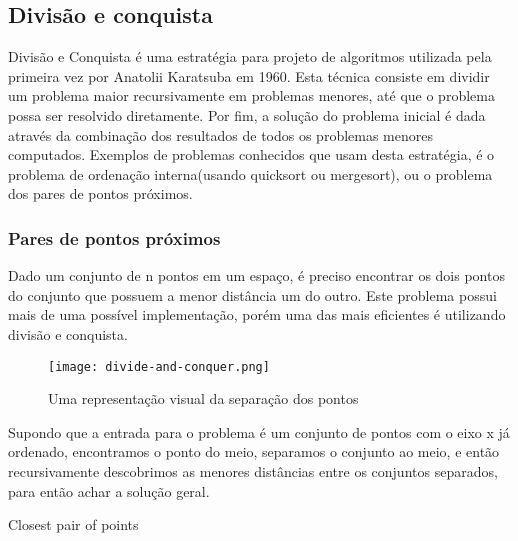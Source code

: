 \subsection{Divisão e conquista}

    Divisão e Conquista é uma estratégia para projeto de algoritmos utilizada 
    pela primeira vez por Anatolii Karatsuba em 1960. Esta técnica consiste em dividir um problema maior 
    recursivamente em problemas menores, até que o problema possa ser resolvido diretamente. Por fim, a
    solução do problema inicial é dada através da combinação dos resultados de todos os problemas 
    menores computados. Exemplos de problemas conhecidos que usam desta estratégia, é o problema de 
    ordenação interna(usando quicksort ou mergesort), ou o problema dos pares de pontos próximos.

\subsubsection{Pares de pontos próximos}

    Dado um conjunto de n pontos em um espaço, é preciso encontrar os dois pontos do conjunto que possuem a 
    menor distância um do outro. Este problema possui mais de uma possível implementação, porém 
    uma das mais eficientes é utilizando divisão e conquista.

    \begin{figure}[ht]
        \centering
        \texttt{[image: divide-and-conquer.png]}
        \caption{Uma representação visual da separação dos pontos}
        \label{fig:divide-and-conquer}
    \end{figure}

    Supondo que a entrada para o problema é um conjunto de pontos com o eixo x já ordenado,
    encontramos o ponto do meio, separamos o conjunto ao meio, e então recursivamente descobrimos
    as menores distâncias entre os conjuntos separados, para então achar a solução geral.

    \begin{algorithm}
        \caption{Closest pair of points} 
        \begin{algorithmic}[1]
        \EndIf
        \EndFor
        \EndProcedure
        \end{algorithmic}
      \end{algorithm}

